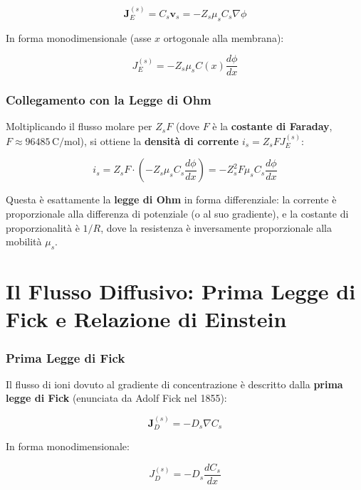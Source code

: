 \begin{equation}
\mathbf{J}_E^{(s)} = C_s \mathbf{v}_s = -Z_s \mu_s C_s \nabla\phi
\end{equation}

In forma monodimensionale (asse $x$ ortogonale alla membrana):

\begin{equation}
J_E^{(s)} = -Z_s \mu_s C(x) \frac{d\phi}{dx}
\end{equation}

\subsubsection{Collegamento con la Legge di Ohm}

Moltiplicando il flusso molare per $Z_s F$ (dove $F$ è la \textbf{costante di Faraday}, $F \approx 96485\,\text{C/mol}$), si ottiene la \textbf{densità di corrente} $i_s = Z_s F J_E^{(s)}$:

\begin{equation}
i_s = Z_s F \cdot \left(-Z_s \mu_s C_s \frac{d\phi}{dx}\right) = -Z_s^2 F \mu_s C_s \frac{d\phi}{dx}
\end{equation}

Questa è esattamente la \textbf{legge di Ohm} in forma differenziale: la corrente è proporzionale alla differenza di potenziale (o al suo gradiente), e la costante di proporzionalità è $1/R$, dove la resistenza è inversamente proporzionale alla mobilità $\mu_s$.



\section{Il Flusso Diffusivo: Prima Legge di Fick e Relazione di Einstein}

\subsubsection{Prima Legge di Fick}

Il flusso di ioni dovuto al gradiente di concentrazione è descritto dalla \textbf{prima legge di Fick} (enunciata da Adolf Fick nel 1855):

\begin{equation}
\mathbf{J}_D^{(s)} = -D_s \nabla C_s
\end{equation}

In forma monodimensionale:

\begin{equation}
J_D^{(s)} = -D_s \frac{dC_s}{dx}
\end{equation}


